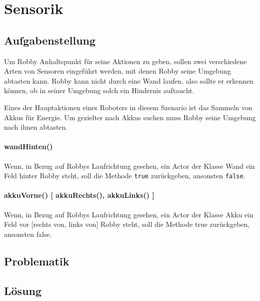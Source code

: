 \section{Sensorik}

\subsection{Aufgabenstellung}
Um Robby Anhaltspunkt für seine Aktionen zu geben, sollen zwei verschiedene Arten von Sensoren eingeführt werden, mit denen Robby seine Umgebung abtasten kann. Robby kann nicht durch eine Wand laufen, also sollte er erkennen können, ob in seiner Umgebung solch ein Hindernis auftaucht.

Eines der Hauptaktionen eines Roboters in diesem Szenario ist das Sammeln von Akkus für Energie. Um gezielter nach Akkus suchen muss Robby seine Umgebung nach ihnen abtasten.

\paragraph{wandHinten()}
Wenn, in Bezug auf Robbys Laufrichtung gesehen, ein Actor der Klasse Wand ein Feld hinter Robby steht, soll die Methode \texttt{true} zurückgeben, ansonsten \texttt{false}.

\paragraph{akkuVorne() [ akkuRechts(), akkuLinks() ]}
Wenn, in Bezug auf Robbys Laufrichtung gesehen, ein Actor der Klasse Akku ein Feld vor [rechts von, links von] Robby steht, soll die Methode true zurückgeben, ansonsten false.

\subsection{Problematik}

\subsection{Lösung}
